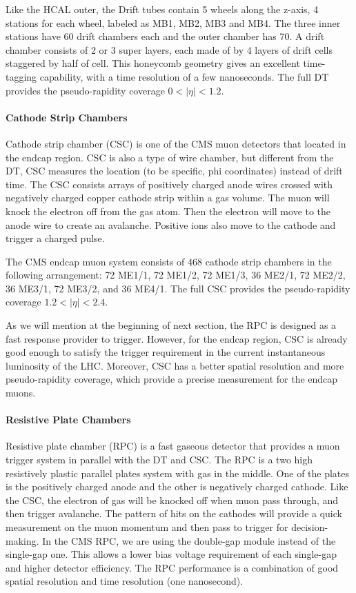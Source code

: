Like the HCAL outer, the Drift tubes contain 5 wheels along the z-axis, 4 stations for each wheel, labeled as MB1, MB2, MB3 and MB4. The three inner stations have 60 drift chambers each and the outer chamber has 70. A drift chamber consists of 2 or 3 super layers, each made of by 4 layers of drift cells staggered by half of cell. This honeycomb geometry gives an excellent time-tagging capability, with a time resolution of a few nanoseconds. The full DT provides the pseudo-rapidity coverage $0<|\eta|<1.2$.

\paragraph{Cathode Strip Chambers}
Cathode strip chamber (CSC) is one of the CMS muon detectors that located in the endcap region. CSC is also a type of wire chamber, but different from the DT, CSC measures the location (to be specific, phi coordinates) instead of drift time. The CSC consists arrays of positively charged anode wires crossed with negatively charged copper cathode strip within a gas volume. The muon will knock the electron off from the gas atom. Then the electron will move to the anode wire to create an avalanche. Positive ions also move to the cathode and trigger a charged pulse.

The CMS endcap muon system consists of 468 cathode strip chambers in the following arrangement: 72 ME1/1, 72 ME1/2, 72 ME1/3, 36 ME2/1, 72 ME2/2, 36 ME3/1, 72 ME3/2, and 36 ME4/1. The full CSC provides the pseudo-rapidity coverage $1.2<|\eta|<2.4$. 

As we will mention at the beginning of next section, the RPC is designed as a fast response provider to trigger. However, for the endcap region, CSC is already good enough to satisfy the trigger requirement in the current instantaneous luminosity of the LHC. Moreover, CSC has a better spatial resolution and more pseudo-rapidity coverage, which provide a precise measurement for the endcap muons.

\paragraph{Resistive Plate Chambers}
Resistive plate chamber (RPC) is a fast gaseous detector that provides a muon trigger system in parallel with the DT and CSC. The RPC is a two high resistively plastic parallel plates system with gas in the middle. One of the plates is the positively charged anode and the other is negatively charged cathode. Like the CSC, the electron of gas will be knocked off when muon pass through, and then trigger avalanche. The pattern of hits on the cathodes will provide a quick measurement on the muon momentum and then pass to trigger for decision-making. In the CMS RPC, we are using the double-gap module instead of the single-gap one. This allows a lower bias voltage requirement of each single-gap and higher detector efficiency. The RPC performance is a combination of good spatial resolution and time resolution (one nanosecond). 

